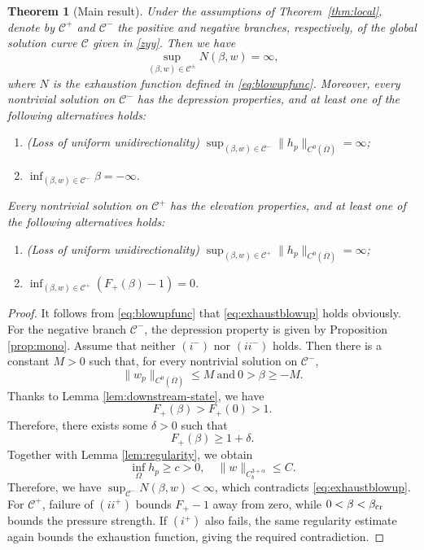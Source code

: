 \documentclass[12pt,letterpaper]{amsart}
\newtheorem{theorem}{Theorem}[section]
\numberwithin{equation}{section}
\begin{document}
\begin{theorem}[Main result]\label{thm:main}
Under the assumptions of Theorem~\ref{thm:local}, denote by $\mathcal C^+$ and $\mathcal C^-$ the positive and negative branches, respectively, of the global solution curve $\mathcal C$ given in \eqref{zyy}.
Then we have
\begin{equation}\label{eq:exhaustblowup}
	\sup_{(\beta,w) \in \mathcal C^\pm} N(\beta,w) = \infty,
\end{equation}
where $N$ is the exhaustion function defined in \eqref{eq:blowupfunc}. Moreover, every nontrivial solution on $\mathcal C^-$ has the depression properties, and at least one of the following alternatives holds:
\begin{enumerate}
	\item [$(i^-)$](Loss of uniform unidirectionality) $\sup_{{(\beta,w)\in\mathcal C^-}} \|h_p\|_{C^0(\overline\Omega)} = \infty$;
	\item [$(ii^-)$] $\inf_{(\beta,w)\in\mathcal C^-}\beta=-\infty$.
\end{enumerate}

{Every nontrivial solution on $\mathcal C^+$ has the elevation properties, and at least one of the following alternatives holds:}
\begin{enumerate}
		\item [$(i^+)$](Loss of uniform unidirectionality) $\sup_{{(\beta,w)\in\mathcal C^+}} \|h_p\|_{{C^0(\overline\Omega)}} = \infty$;
		\item [$(ii^+)$] $\inf_{(\beta,w) \in \mathcal{C}^+} (F_+( \beta ) - 1) = 0$.
\end{enumerate}
\end{theorem}
	\begin{proof}
It follows from \eqref{eq:blowupfunc} that \eqref{eq:exhaustblowup} holds obviously.
		For the negative branch $\mathcal{C}^-$,  the depression property is given by Proposition \ref{prop:mono}. Assume that neither  $(i^-)$ nor $(ii^-)$ holds. {Then there is a constant $M>0$ such that, for every nontrivial solution on $\mathcal C^-$,}
		\begin{equation*}
			\|w_p\|_{C^0(\overline\Omega)}\leq M \mathrm{~and~}0>\beta\geq -M.
		\end{equation*}
		Thanks to Lemma \ref{lem:downstream-state}, we have
		\begin{equation*}
			F_+(\beta)>F_+(0)>1.
		\end{equation*}
		Therefore, there exists some $\delta>0$ such that
		\begin{equation*}
			F_+(\beta)\geq 1+\delta.
		\end{equation*}
		Together with Lemma \ref{lem:regularity}, we  obtain
		\[\inf_{\Omega} h_p \geq c> 0, \quad \|w\|_{C_b^{3+\alpha}} \leq C.\]
		Therefore, we have $\sup_{\mathcal C^-} N(\beta,w) < \infty$, which contradicts \eqref{eq:exhaustblowup}. {For $\mathcal C^+$, failure of $(ii^+)$ bounds $F_+-1$ away from zero, while $0<\beta<\beta_{\rm cr}$ bounds the pressure strength. If $(i^+)$ also fails, the same regularity estimate again bounds the exhaustion function, giving the required contradiction.}
	\end{proof}
\end{document}
